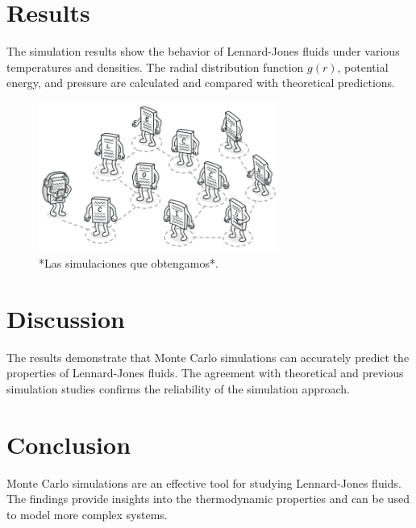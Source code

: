 \documentclass[a4paper,12pt]{article}
\begin{document}
\section{Results}
The simulation results show the behavior of Lennard-Jones fluids under various temperatures and densities. The radial distribution function \( g(r) \), potential energy, and pressure are calculated and compared with theoretical predictions.

\begin{figure}[h]
    \centering
    \includegraphics[width=0.7\textwidth]{08.png}
    \caption{*Las simulaciones que obtengamos*.}
    \label{fig:gr}
\end{figure}

\section{Discussion}
The results demonstrate that Monte Carlo simulations can accurately predict the properties of Lennard-Jones fluids. The agreement with theoretical and previous simulation studies confirms the reliability of the simulation approach. 

\section{Conclusion}
Monte Carlo simulations are an effective tool for studying Lennard-Jones fluids. The findings provide insights into the thermodynamic properties and can be used to model more complex systems. 



\end{document}
